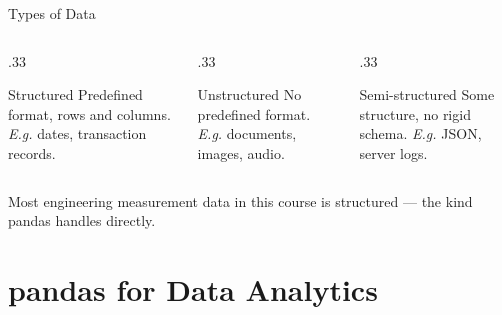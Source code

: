 \documentclass[9pt,aspectratio=169,xcolor=table]{beamer}
\begin{document}
\begin{frame}{Types of Data}
    \leavevmode
    \small
    \begin{columns}[t]
        \begin{column}{.33\textwidth}
            \begin{block}{Structured}
                \scriptsize Predefined format, rows and columns.
                \emph{E.g.} dates, transaction records.
            \end{block}
        \end{column}
        \begin{column}{.33\textwidth}
            \begin{block}{Unstructured}
                \scriptsize No predefined format. \emph{E.g.} documents,
                images, audio.
            \end{block}
        \end{column}
        \begin{column}{.33\textwidth}
            \begin{block}{Semi-structured}
                \scriptsize Some structure, no rigid schema.
                \emph{E.g.} JSON, server logs.
            \end{block}
        \end{column}
    \end{columns}

    \vspace{3mm}
    {\small Most engineering measurement data in this course is
    \alert{structured} --- the kind pandas handles directly.}
\end{frame}

\section{pandas for Data Analytics}
\end{document}
